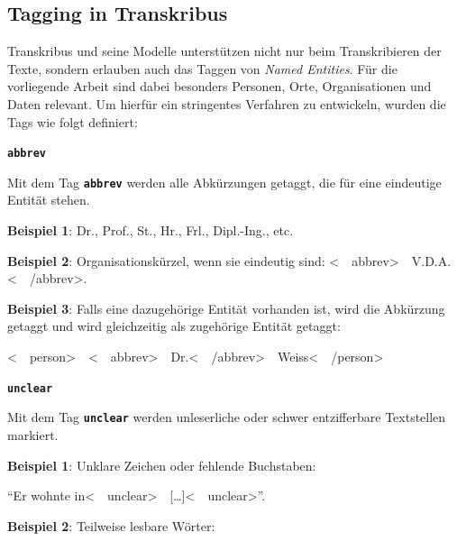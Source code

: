 \documentclass[12pt, a4paper, ngerman, bidi=default]{article}
\begin{document}
\subsection{Tagging in Transkribus}


    Transkribus und seine Modelle unterstützen nicht nur beim Transkribieren der Texte, sondern erlauben auch das Taggen von \textit{Named Entities}.  
    Für die vorliegende Arbeit sind dabei besonders Personen, Orte, Organisationen und Daten relevant.  
    Um hierfür ein stringentes Verfahren zu entwickeln, wurden die Tags wie folgt definiert:
    
    \begin{description}

    \item \textbf{\colorbox{abbrev}{\texttt{abbrev}}}
        
    Mit dem Tag \texttt{\texttt{\textbf{{\colorbox{abbrev}{abbrev}}}}} werden alle Abkürzungen getaggt, die für eine eindeutige Entität stehen. 
    
    \noindent\textbf{ Beispiel 1}: Dr., Prof., St., Hr., Frl., Dipl.-Ing., etc.
    
    \textbf{ Beispiel 2}: Organisationskürzel, wenn sie eindeutig sind: 
    \colorbox{VeryLightGray}{\textless\ \  abbrev\textgreater\ \  V.D.A.\textless\ \  /abbrev\textgreater}.

    \textbf{\textbf{ Beispiel 3}}: Falls eine dazugehörige Entität vorhanden ist, wird die Abkürzung getaggt und wird gleichzeitig als zugehörige Entität getaggt:
    
    \colorbox{VeryLightGray}{\textless\ \  person\textgreater\ \  \textless\ \  abbrev\textgreater\ \  Dr.\textless\ \  /abbrev\textgreater\ \  Weiss{\textless\ \  /person\textgreater}}

    
    \item \textbf{\colorbox{unclear}{\texttt{unclear}}}
    

    Mit dem Tag \texttt{\texttt{\textbf{{\colorbox{unclear}{unclear}}}}} werden unleserliche oder schwer entzifferbare Textstellen markiert. 

    
    \noindent\textbf{ Beispiel 1}: Unklare Zeichen oder fehlende Buchstaben: 

    \colorbox{VeryLightGray}{\enquote{Er wohnte in\textless\ \  unclear\textgreater\ \  [\ldots]\textless\ \  unclear\textgreater}.}

    \textbf{ Beispiel 2}: Teilweise lesbare Wörter:


\end{description}
\end{document}
